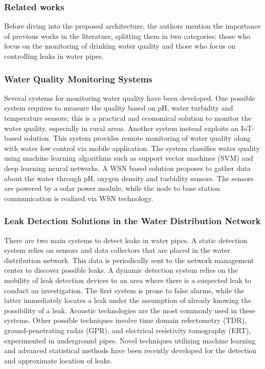 \documentclass[draft, {\secondLanguage}, english]{volcanica-template}
\begin{document}
\subsubsection{Related works}
Before diving into the proposed architecture, the authors mention the importance of previous works in the literature, splitting them in two categories: those who focus on the monitoring of drinking water quality and those who focus on controlling leaks in water pipes.

\subsubsection{Water Quality Monitoring Systems}
Several systems for monitoring water quality have been developed. One possible system requires to measure the quality based on pH, water turbidity and temperature sensors; this is a practical and economical solution to monitor the water quality, especially in rural areas.
Another system instead exploits an IoT-based solution. This system provides remote monitoring of water quality along with water fow control via mobile application. The system classifies water quality using machine learning algorithms such as support vector machines (SVM) and deep learning neural networks.
A WSN based solution proposes to gather data about the water through pH, oxygen density and turbidity sensors. The sensors are powered by a solar power module, while the node to base station communication is realized via WSN technology.

\subsubsection{Leak Detection Solutions in the Water Distribution Network}
There are two main systems to detect leaks in water pipes. A static detection system relies on sensors and data collectors that are placed in the water distribution network. This data is periodically sent to the network management center to discover possible leaks. A dynamic detection system relies on the mobility of leak detection devices to an area where there is a suspected leak to conduct an investigation. The first system is prone to false alarms, while the latter immediately locates a leak under the assumption of already knowing the possibility of a leak. Acoustic technologies are the most commonly used in these systems. Other possible techniques involve time domain refectometry (TDR), ground-penetrating radar (GPR), and electrical resistivity tomography (ERT), experimented in underground pipes. Novel techniques utilizing machine learning and advanced statistical methods have been recently developed for the detection and approximate location of leaks.
\end{document}
